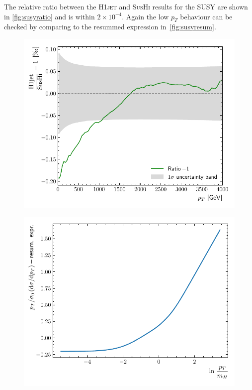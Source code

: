 \documentclass[12pt]{article}
\begin{document}
The relative ratio between the \textsc{H1jet} and \textsc{SusHi} results for the SUSY are shown in \autoref{fig:susyratio} and is within $2 \times 10^{-4}$. Again the low $p_T$ behaviour can be checked by comparing to the resummed expression in~\autoref{fig:susyresum}. 
\begin{figure}[h!] 
\centering
\begin{minipage}{.485\textwidth}
  \centering
  \includegraphics[width=\linewidth]{figures/SUSYratio.pdf}
  \label{fig:susyratio}
\end{minipage}%
\hfill%
\begin{minipage}{.485\textwidth}
  \centering
  \includegraphics[width=\linewidth]{figures/SUSYresum.pdf}
  \label{fig:susyresum}
\end{minipage}
\end{figure}
\end{document}
